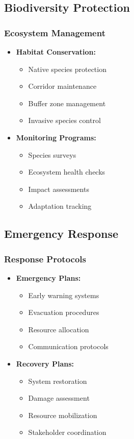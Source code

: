 \subsection{Biodiversity Protection}

\subsubsection{Ecosystem Management}
\begin{itemize}
    \item \textbf{Habitat Conservation:}
    \begin{itemize}
        \item Native species protection
        \item Corridor maintenance
        \item Buffer zone management
        \item Invasive species control
    \end{itemize}
    
    \item \textbf{Monitoring Programs:}
    \begin{itemize}
        \item Species surveys
        \item Ecosystem health checks
        \item Impact assessments
        \item Adaptation tracking
    \end{itemize}
\end{itemize}

\subsection{Emergency Response}

\subsubsection{Response Protocols}
\begin{itemize}
    \item \textbf{Emergency Plans:}
    \begin{itemize}
        \item Early warning systems
        \item Evacuation procedures
        \item Resource allocation
        \item Communication protocols
    \end{itemize}
    
    \item \textbf{Recovery Plans:}
    \begin{itemize}
        \item System restoration
        \item Damage assessment
        \item Resource mobilization
        \item Stakeholder coordination
    \end{itemize}
\end{itemize}
